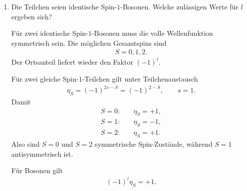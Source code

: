 \documentclass[11pt,a4paper]{scrartcl}
\begin{document}
\begin{enumerate}[label=(\alph*)]
\begin{calculationbox}
\begin{calculationbox}[title=Fermionische Antisymmetrie]
                \begin{solutionbox}[title=Erlaubte relative Drehimpulse]
                    \begin{align*}
                        S=0\text{ Singulett:}\quad &(-1)^l(-1)=-1
                        \quad\Longrightarrow\quad l=0,2,4,\dots,\\
                        S=1\text{ Triplett:}\quad &(-1)^l(+1)=-1
                        \quad\Longrightarrow\quad l=1,3,5,\dots.
                    \end{align*}
                \end{solutionbox}
            \end{calculationbox}
        \end{calculationbox}

        \item Die Teilchen seien identische Spin-$1$-Bosonen. Welche zulässigen Werte für $l$ ergeben sich?

        \begin{calculationbox}
            Für zwei identische Spin-$1$-Bosonen muss die volle Wellenfunktion symmetrisch sein. Die möglichen Gesamtspins sind
            \begin{align*}
                S=0,1,2.
            \end{align*}
            Der Ortsanteil liefert wieder den Faktor $(-1)^l$.

            \begin{calculationbox}[title=Symmetrie des Spinanteils]
                Für zwei gleiche Spin-$1$-Teilchen gilt unter Teilchenaustausch
                \begin{align*}
                    \eta_S=(-1)^{2s-S}=(-1)^{2-S},
                    \qquad s=1.
                \end{align*}
                Damit
                \begin{align*}
                    S=0:&\quad \eta_S=+1,\\
                    S=1:&\quad \eta_S=-1,\\
                    S=2:&\quad \eta_S=+1.
                \end{align*}
                Also sind $S=0$ und $S=2$ symmetrische Spin-Zustände, während $S=1$ antisymmetrisch ist.
            \end{calculationbox}

            \begin{calculationbox}[title=Bosonische Symmetriebedingung]
                Für Bosonen gilt
                \begin{align*}
                    (-1)^l\eta_S=+1.
                \end{align*}


\end{calculationbox}
\end{calculationbox}
\end{enumerate}
\end{document}
